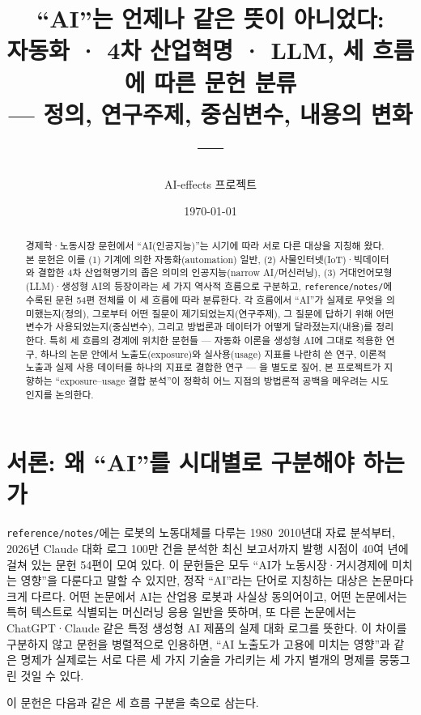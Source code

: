 \documentclass[11pt]{article}
\title{``AI''는 언제나 같은 뜻이 아니었다:\\[1mm]
자동화 · 4차 산업혁명 · LLM, 세 흐름에 따른 문헌 분류\\[2mm]
\large --- 정의, 연구주제, 중심변수, 내용의 변화 ---}
\author{AI-effects 프로젝트}
\date{\today}
\begin{document}
\maketitle

\begin{abstract}
\noindent 경제학·노동시장 문헌에서 ``AI(인공지능)''는 시기에 따라 서로 다른 대상을 지칭해 왔다. 본 문헌은 이를 (1) 기계에 의한 자동화(automation) 일반, (2) 사물인터넷(IoT)·빅데이터와 결합한 4차 산업혁명기의 좁은 의미의 인공지능(narrow AI/머신러닝), (3) 거대언어모형(LLM)·생성형 AI의 등장이라는 세 가지 역사적 흐름으로 구분하고, \texttt{reference/notes/}에 수록된 문헌 54편 전체를 이 세 흐름에 따라 분류한다. 각 흐름에서 ``AI''가 실제로 무엇을 의미했는지(정의), 그로부터 어떤 질문이 제기되었는지(연구주제), 그 질문에 답하기 위해 어떤 변수가 사용되었는지(중심변수), 그리고 방법론과 데이터가 어떻게 달라졌는지(내용)를 정리한다. 특히 세 흐름의 경계에 위치한 문헌들 — 자동화 이론을 생성형 AI에 그대로 적용한 연구, 하나의 논문 안에서 노출도(exposure)와 실사용(usage) 지표를 나란히 쓴 연구, 이론적 노출과 실제 사용 데이터를 하나의 지표로 결합한 연구 — 을 별도로 짚어, 본 프로젝트가 지향하는 ``exposure--usage 결합 분석''이 정확히 어느 지점의 방법론적 공백을 메우려는 시도인지를 논의한다.
\end{abstract}

\tableofcontents

\section{서론: 왜 ``AI''를 시대별로 구분해야 하는가}

\texttt{reference/notes/}에는 로봇의 노동대체를 다루는 1980~2010년대 자료 분석부터, 2026년 Claude 대화 로그 100만 건을 분석한 최신 보고서까지 발행 시점이 40여 년에 걸쳐 있는 문헌 54편이 모여 있다. 이 문헌들은 모두 ``AI가 노동시장·거시경제에 미치는 영향''을 다룬다고 말할 수 있지만, 정작 ``AI''라는 단어로 지칭하는 대상은 논문마다 크게 다르다. 어떤 논문에서 AI는 산업용 로봇과 사실상 동의어이고, 어떤 논문에서는 특허 텍스트로 식별되는 머신러닝 응용 일반을 뜻하며, 또 다른 논문에서는 ChatGPT·Claude 같은 특정 생성형 AI 제품의 실제 대화 로그를 뜻한다. 이 차이를 구분하지 않고 문헌을 병렬적으로 인용하면, ``AI 노출도가 고용에 미치는 영향''과 같은 명제가 실제로는 서로 다른 세 가지 기술을 가리키는 세 가지 별개의 명제를 뭉뚱그린 것일 수 있다.

이 문헌은 다음과 같은 세 흐름 구분을 축으로 삼는다.
\end{document}
